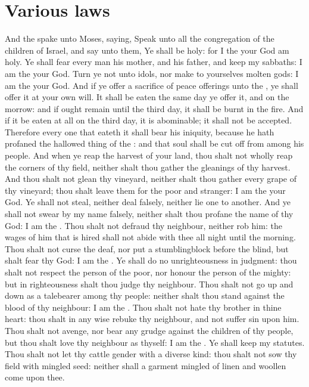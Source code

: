 \section*{Various laws}
\begin{biblechapter} %
\verse And the \LORD spake unto Moses, saying,
\verse Speak unto all the congregation of the children of Israel, and say unto them, Ye shall be holy: for I the \LORD your God am holy.
\verse Ye shall fear every man his mother, and his father, and keep my sabbaths: I am the \LORD your God.
\verse Turn ye not unto idols, nor make to yourselves molten gods: I am the \LORD your God.
\verse And if ye offer a sacrifice of peace offerings unto the \LORD, ye shall offer it at your own will.
\verse It shall be eaten the same day ye offer it, and on the morrow: and if ought remain until the third day, it shall be burnt in the fire.
\verse And if it be eaten at all on the third day, it is abominable; it shall not be accepted.
\verse Therefore every one that eateth it shall bear his iniquity, because he hath profaned the hallowed thing of the \LORD: and that soul shall be cut off from among his people.
\verse And when ye reap the harvest of your land, thou shalt not wholly reap the corners of thy field, neither shalt thou gather the gleanings of thy harvest.
\verse And thou shalt not glean thy vineyard, neither shalt thou gather every grape of thy vineyard; thou shalt leave them for the poor and stranger: I am the \LORD your God.
\verse Ye shall not steal, neither deal falsely, neither lie one to another.
\verse And ye shall not swear by my name falsely, neither shalt thou profane the name of thy God: I am the \LORD.
\verse Thou shalt not defraud thy neighbour, neither rob him: the wages of him that is hired shall not abide with thee all night until the morning.
\verse Thou shalt not curse the deaf, nor put a stumblingblock before the blind, but shalt fear thy God: I am the \LORD.
\verse Ye shall do no unrighteousness in judgment: thou shalt not respect the person of the poor, nor honour the person of the mighty: but in righteousness shalt thou judge thy neighbour.
\verse Thou shalt not go up and down as a talebearer among thy people: neither shalt thou stand against the blood of thy neighbour: I am the \LORD.
\verse Thou shalt not hate thy brother in thine heart: thou shalt in any wise rebuke thy neighbour, and not suffer sin upon him.
\verse Thou shalt not avenge, nor bear any grudge against the children of thy people, but thou shalt love thy neighbour as thyself: I am the \LORD.
\verse Ye shall keep my statutes. Thou shalt not let thy cattle gender with a diverse kind: thou shalt not sow thy field with mingled seed: neither shall a garment mingled of linen and woollen come upon thee.

\end{biblechapter}

